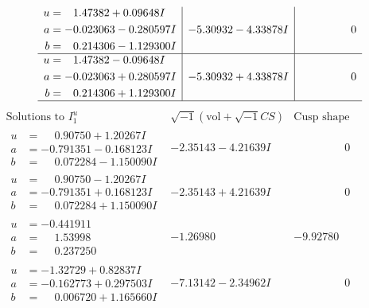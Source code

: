 \documentclass[1p]{elsarticle_modified}
\theoremstyle{definition}
\newcommand{\I}{\sqrt{-1}}
\begin{document}
$$\begin{array}{c|c|c}
\begin{aligned}
u &= \phantom{-}1.47382 + 0.09648 I \\
a &= -0.023063 - 0.280597 I \\
b &= \phantom{-}0.214306 - 1.129300 I\end{aligned}
 & -5.30932 - 4.33878 I & \phantom{-0.000000 } 0 \\ \hline\begin{aligned}
u &= \phantom{-}1.47382 - 0.09648 I \\
a &= -0.023063 + 0.280597 I \\
b &= \phantom{-}0.214306 + 1.129300 I\end{aligned}
 & -5.30932 + 4.33878 I & \phantom{-0.000000 } 0\\
 \hline 
 \end{array}$$\newpage$$\begin{array}{c|c|c}  
\text{Solutions to }I^u_{1}& \I (\text{vol} + \sqrt{-1}CS) & \text{Cusp shape}\\
 \hline 
\begin{aligned}
u &= \phantom{-}0.90750 + 1.20267 I \\
a &= -0.791351 - 0.168123 I \\
b &= \phantom{-}0.072284 - 1.150090 I\end{aligned}
 & -2.35143 - 4.21639 I & \phantom{-0.000000 } 0 \\ \hline\begin{aligned}
u &= \phantom{-}0.90750 - 1.20267 I \\
a &= -0.791351 + 0.168123 I \\
b &= \phantom{-}0.072284 + 1.150090 I\end{aligned}
 & -2.35143 + 4.21639 I & \phantom{-0.000000 } 0 \\ \hline\begin{aligned}
u &= -0.441911\phantom{ +0.000000I} \\
a &= \phantom{-}1.53998\phantom{ +0.000000I} \\
b &= \phantom{-}0.237250\phantom{ +0.000000I}\end{aligned}
 & -1.26980\phantom{ +0.000000I} & -9.92780\phantom{ +0.000000I} \\ \hline\begin{aligned}
u &= -1.32729 + 0.82837 I \\
a &= -0.162773 + 0.297503 I \\
b &= \phantom{-}0.006720 + 1.165660 I\end{aligned}
 & -7.13142 - 2.34962 I & \phantom{-0.000000 } 0 \\ \hline\begin{aligned}

\end{aligned}
\end{array}$$
\end{document}
